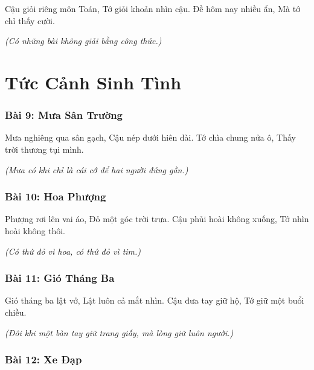 \documentclass[14pt,a4paper,twoside]{extbook}
\begin{document}
Cậu giỏi riêng môn Toán,
Tớ giỏi khoản nhìn cậu.
Đề hôm nay nhiều ẩn,
Mà tớ chỉ thấy cười.

\vspace{1.5cm}\noindent
\textit{(Có những bài không giải bằng công thức.)}

\newpage

\part{Tức Cảnh Sinh Tình}

\section*{Bài 9: Mưa Sân Trường}

Mưa nghiêng qua sân gạch,
Cậu nép dưới hiên dài.
Tớ chìa chung nửa ô,
Thấy trời thương tụi mình.

\vspace{1.5cm}\noindent
\textit{(Mưa có khi chỉ là cái cớ để hai người đứng gần.)}

\vspace{2cm}

\section*{Bài 10: Hoa Phượng}

Phượng rơi lên vai áo,
Đỏ một góc trời trưa.
Cậu phủi hoài không xuống,
Tớ nhìn hoài không thôi.

\vspace{1.5cm}\noindent
\textit{(Có thứ đỏ vì hoa, có thứ đỏ vì tim.)}

\vspace{2cm}

\section*{Bài 11: Gió Tháng Ba}

Gió tháng ba lật vở,
Lật luôn cả mắt nhìn.
Cậu đưa tay giữ hộ,
Tớ giữ một buổi chiều.

\vspace{1.5cm}\noindent
\textit{(Đôi khi một bàn tay giữ trang giấy, mà lòng giữ luôn người.)}

\vspace{2cm}

\section*{Bài 12: Xe Đạp}
\end{document}

